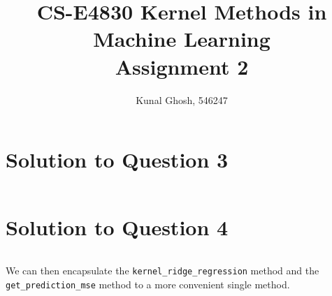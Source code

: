 \documentclass[a4paper,11pt]{article}
\begin{document}
\title{CS-E4830 Kernel Methods in Machine Learning \\ Assignment 2} %
\author{Kunal Ghosh, 546247} %
\maketitle
\section*{}

\section*{Solution to Question 3}
\inputminted[baselinestretch=1, fontsize=\small, breaklines=true]{octave}{../kernel_ridge_regression.m}
\section*{Solution to Question 4}
\inputminted[baselinestretch=1, fontsize=\small, breaklines=true]{octave}{../get_prediction_mse.m}

We can then encapsulate the \texttt{kernel\_ridge\_regression} method and the \texttt{get\_prediction\_mse} method to a more convenient single method. 

\inputminted[baselinestretch=1, fontsize=\small, breaklines=true]{octave}{../kernel_ridge_regression_on_dataset.m}
\end{document}
